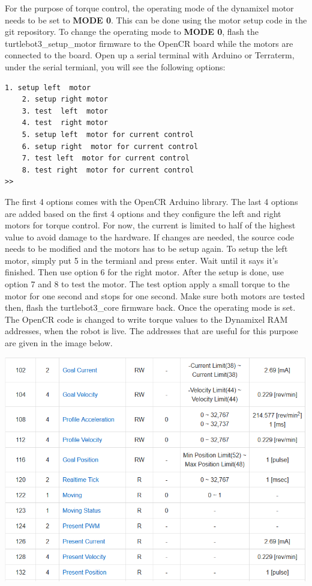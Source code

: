 \documentclass[12]{article}
\begin{document}
For the purpose of torque control, the operating mode of the dynamixel motor needs to be set to \textbf{MODE 0}. This can be done using the motor setup code in the git repository.
To change the operating mode to \textbf{MODE 0}, flash the turtlebot3\_setup\_motor firmware to the OpenCR board while the motors are connected to the board. 
Open up a serial terminal with Arduino or Terraterm, under the serial termianl, you will see the following options:
\begin{lstlisting}[style=bash]
    1. setup left  motor
    2. setup right motor
    3. test  left  motor
    4. test  right motor
    5. setup left  motor for current control
    6. setup right  motor for current control
    7. test left  motor for current control
    8. test right  motor for current control
>> 
\end{lstlisting}
The first 4 options comes with the OpenCR Arduino library. The last 4 options are added based on the first 4 options and they configure the left and right motors for torque control.
For now, the current is limited to half of the highest value to avoid damage to the hardware. If changes are needed, the source code needs to be modified and the motors has to be setup again. 
To setup the left motor, simply put 5 in the termianl and press enter. Wait until it says it's finished. Then use option 6 for the right motor.
After the setup is done, use option 7 and 8 to test the motor. The test option apply a small torque to the motor for one second and stops for one second. Make sure both motors are tested then, flash the turtlebot3\_core firmware back.
Once the operating mode is set. The OpenCR code is changed to write torque values to the Dynamixel RAM addresses, when the robot is live. The addresses that are useful for this purpose are given in the image below.

\begin{center}
	\includegraphics[width=\linewidth]{images/dxl_control_table.png}\\
\end{center}
\end{document}

